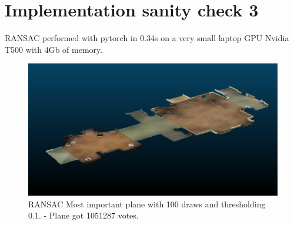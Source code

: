 \documentclass[a4paper]{article}
\begin{document}
\section*{Implementation sanity check 3}
RANSAC performed with pytorch in 0.34s on a very small laptop GPU Nvidia T500 with 4Gb of memory.
\begin{figure}[ht]
  \centering
  \includegraphics[width=0.3\linewidth]{figures/RANSAC_draw100_distance_thresholding_0_01_TOTAL.png}
  \caption{RANSAC Most important plane with 100 draws and thresholding 0.1. - Plane got 1051287 votes.}
  \label{fig:sanity_check_planes}
\end{figure}
\end{document}
